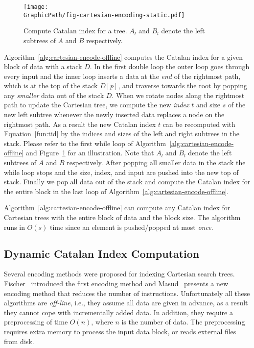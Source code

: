 

\begin{figure}[!thb]
  \centering
  \texttt{[image: \\GraphicPath/fig-cartesian-encoding-static.pdf]}
  \caption{Compute Catalan index for a tree.  $A_l$ and $B_l$ denote
    the left subtrees of $A$ and $B$ respectively.}
  \label{fig:fig-cartesian-encoding-static}
\end{figure}

Algorithm~\ref{alg:cartesian-encode-offline} computes the Catalan
index for a given block of data with a stack $D$.  In the first double
loop the outer loop goes through every input and the inner loop
inserts a data at the {\em end} of the rightmost path, which is at
the top of the stack $D[p]$, and traverse towards the root by popping
any {\em smaller} data out of the stack $D$.  When we rotate nodes
along the rightmost path to update the Cartesian tree, we compute the
new {\em index} $t$ and size $s$ of the new left subtree whenever the
newly inserted data replaces a node on the rightmost path.  As a
result the new Catalan index $t$ can be recomputed with
Equation~\ref{fun:tid} by the indices and sizes of the left and right
subtrees in the stack.  Please refer to the first while loop of
Algorithm~\ref{alg:cartesian-encode-offline} and
Figure~\ref{fig:fig-cartesian-encoding-static} for an illustration.
Note that $A_l$ and $B_l$ denote the left subtrees of $A$ and $B$
respectively.  After popping all smaller data in the stack the while
loop stops and the size, index, and input are pushed into the new top
of stack.  Finally we pop all data out of the stack and compute the
Catalan index for the entire block in the last loop of
Algorithm~\ref{alg:cartesian-encode-offline}.

Algorithm~\ref{alg:cartesian-encode-offline} can compute any Catalan
index for Cartesian trees with the entire block of data and the block
size.  The algorithm runs in $O(s)$ time since an element is
pushed/popped at most {\em once}.



\subsection{Dynamic Catalan Index Computation}

Several encoding methods were proposed for indexing Cartesian search
trees.  Fischer~\cite{Fischer2006TheoreticalAP} introduced the first
encoding method and Masud~\cite{Hasan2010CacheOA} presents a new
encoding method that reduces the number of instructions.
Unfortunately all these algorithms are {\em off-line}, i.e., they
assume all data are given in advance, as a result they cannot cope
with incrementally added data.  In addition, they require a
preprocessing of time $O(n)$, where $n$ is the number of data.  The
preprocessing requires extra memory to process the input data block,
or reads external files from disk.

